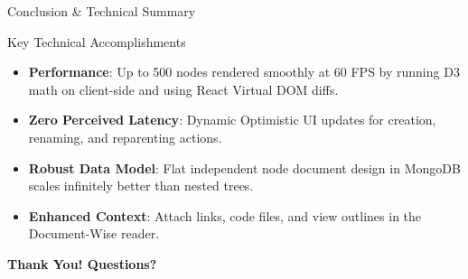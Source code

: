 \documentclass[aspectratio=169, 10pt]{beamer}
\begin{document}
\begin{frame}{Conclusion \& Technical Summary}
  \begin{block}{Key Technical Accomplishments}
    \begin{itemize}
      \item[\checkmark] \textbf{Performance}: Up to 500 nodes rendered smoothly at 60 FPS by running D3 math on client-side and using React Virtual DOM diffs.
      \item[\checkmark] \textbf{Zero Perceived Latency}: Dynamic Optimistic UI updates for creation, renaming, and reparenting actions.
      \item[\checkmark] \textbf{Robust Data Model}: Flat independent node document design in MongoDB scales infinitely better than nested trees.
      \item[\checkmark] \textbf{Enhanced Context}: Attach links, code files, and view outlines in the Document-Wise reader.
    \end{itemize}
  \end{block}
  \vspace{0.5em}
  \begin{center}
    \textbf{Thank You! Questions?}
  \end{center}
\end{frame}
\end{document}
